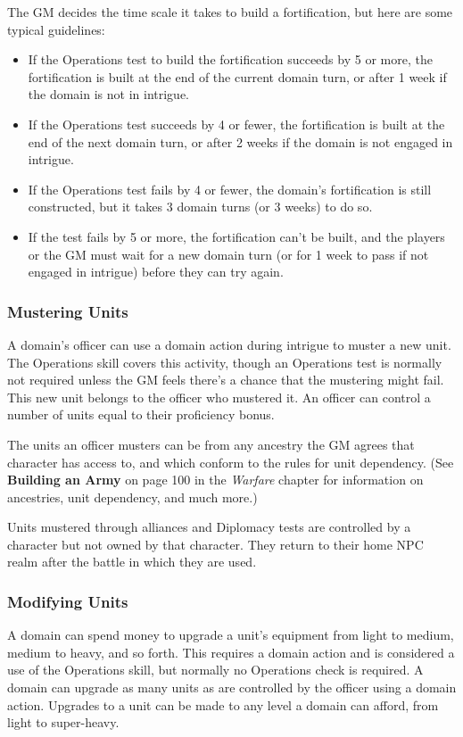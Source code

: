 \documentclass[10pt,a4paper,twoside,bg=print,twocolumn,openany,nodeprecatedcode]{dndbook}
\begin{document}
The GM decides the time scale it takes to build a fortification, but here are some typical guidelines:


\begin{itemize}
\item If the Operations test to build the fortification succeeds by 5 or more, the fortification is built at the end of the current domain turn, or after 1 week if the domain is not in intrigue.
\item If the Operations test succeeds by 4 or fewer, the fortification is built at the end of the next domain turn, or after 2 weeks if the domain is not engaged in intrigue.
\item If the Operations test fails by 4 or fewer, the domain's fortification is still constructed, but it takes 3 domain turns (or 3 weeks) to do so.
\item If the test fails by 5 or more, the fortification can't be built, and the players or the GM must wait for a new domain turn (or for 1 week to pass if not engaged in intrigue) before they can try again.
\end{itemize}

\subsubsection{Mustering Units}
A domain's officer can use a domain action during intrigue to muster a new unit. The Operations skill covers this activity, though an Operations test is normally not required unless the GM feels there's a chance that the mustering might fail. This new unit belongs to the officer who mustered it. An officer can control a number of units equal to their proficiency bonus.

The units an officer musters can be from any ancestry the GM agrees that character has access to, and which conform to the rules for unit dependency. (See \textbf{Building an Army} on page 100 in the \textit{Warfare} chapter for information on ancestries, unit dependency, and much more.)

Units mustered through alliances and Diplomacy tests are controlled by a character but not owned by that character. They return to their home NPC realm after the battle in which they are used.

\subsubsection{Modifying Units}
A domain can spend money to upgrade a unit's equipment from light to medium, medium to heavy, and so forth. This requires a domain action and is considered a use of the Operations skill, but normally no Operations check is required. A domain can upgrade as many units as are controlled by the officer using a domain action. Upgrades to a unit can be made to any level a domain can afford, from light to super-heavy.
\end{document}
